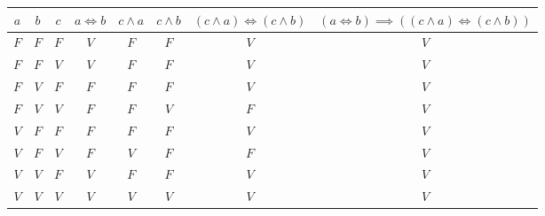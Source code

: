 \documentclass[12pt]{article}
\begin{document}
\begin{center}
	\begin{tabular}{|c|c|c|c|c|c|c|c|}
		\hline
		$a$ & $b$ & $c$ & $a\iff b$ & $c\wedge a$ & $c\wedge b$ & $(c\wedge a)\iff (c\wedge b)$ & $(a\iff b)\implies ((c\wedge a)\iff (c\wedge b))$\\ 
		\hline
		$F$ & $F$ & $F$ & $V$ & $F$ & $F$ & $V$ & $V$\\ 
		\hline
		$F$ & $F$ & $V$ & $V$ & $F$ & $F$ & $V$ & $V$\\ 
		\hline
		$F$ & $V$ & $F$ & $F$ & $F$ & $F$ & $V$ & $V$\\ 
		\hline
		$F$ & $V$ & $V$ & $F$ & $F$ & $V$ & $F$ & $V$\\ 
		\hline
		$V$ & $F$ & $F$ & $F$ & $F$ & $F$ & $V$ & $V$\\ 
		\hline
		$V$ & $F$ & $V$ & $F$ & $V$ & $F$ & $F$ & $V$\\ 
		\hline
		$V$ & $V$ & $F$ & $V$ & $F$ & $F$ & $V$ & $V$\\ 
		\hline
		$V$ & $V$ & $V$ & $V$ & $V$ & $V$ & $V$ & $V$\\ 
		\hline
\end{tabular}\end{center}
\end{document}
